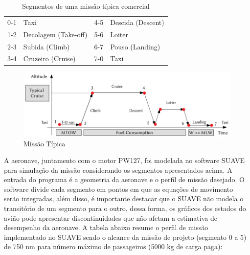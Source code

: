 \begin{table}[H]
\centering
\begin{tabular}{clcl}
\toprule
0-1 & Taxi & 4-5 & Descida (Descent) \\
1-2 & Decolagem (Take-off) & 5-6 & Loiter \\
2-3 & Subida (Climb) & 6-7 & Pouso (Landing) \\
3-4 & Cruzeiro (Cruise) & 7-0 & Taxi \\
\bottomrule
\end{tabular}
\caption{Segmentos de uma missão típica comercial}
\label{tbl:mission_segments}
\end{table}


\begin{figure}[H]
\centering
\includegraphics[width=130mm]{images/parte4/missao_tipica_generica.PNG}
\caption{Missão Típica}
\label{fig:typical_mission}
\end{figure}

A aeronave, juntamento com o motor PW127, foi modelada no software SUAVE para simulação da missão considerando os segmentos apresentados acima. A entrada do programa é a geometria da aeronave e o perfil de missão desejado. O software divide cada segmento em pontos em que as equações de movimento serão integradas, além disso, é importante destacar que o SUAVE não modela o transitório de um segmento para o outro, dessa forma, os gráficos dos estados do avião pode apresentar discontinuidades que não afetam a estimativa de desempenho da aeronave. A tabela abaixo resume o perfil de missão implementado no SUAVE sendo o alcance da missão de projeto (segmento 0 a 5) de 750 nm para número máximo de passageiros (5000 kg de carga paga):

